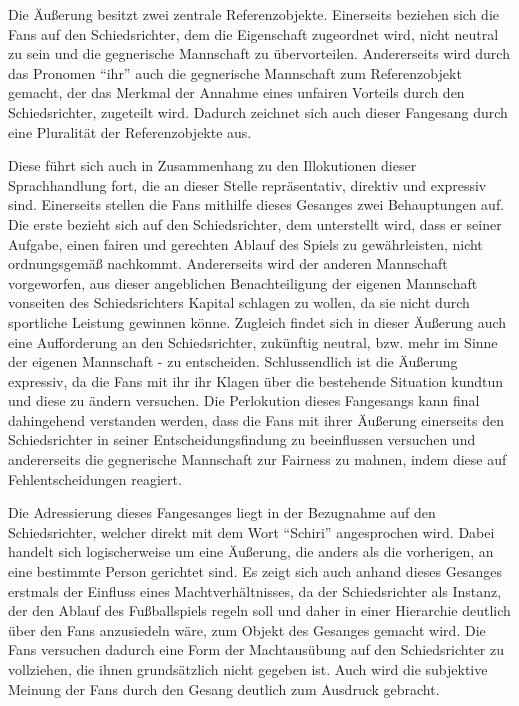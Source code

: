 Die Äußerung besitzt zwei zentrale Referenzobjekte.
Einerseits beziehen sich die Fans auf den Schiedsrichter, dem die Eigenschaft zugeordnet wird, nicht neutral zu sein und die gegnerische Mannschaft zu übervorteilen.
Andererseits wird durch das Pronomen "`ihr"' auch die gegnerische Mannschaft zum Referenzobjekt gemacht, der das Merkmal der Annahme eines unfairen Vorteils durch den Schiedsrichter, zugeteilt wird.
Dadurch zeichnet sich auch dieser Fangesang durch eine Pluralität der Referenzobjekte aus.

Diese führt sich auch in Zusammenhang zu den Illokutionen dieser Sprachhandlung fort, die an dieser Stelle repräsentativ, direktiv und expressiv sind.
Einerseits stellen die Fans mithilfe dieses Gesanges zwei Behauptungen auf.
Die erste bezieht sich auf den Schiedsrichter, dem unterstellt wird, dass er seiner Aufgabe, einen fairen und gerechten Ablauf des Spiels zu gewährleisten, nicht ordnungsgemäß nachkommt.
Andererseits wird der anderen Mannschaft vorgeworfen, aus dieser angeblichen Benachteiligung der eigenen Mannschaft vonseiten des Schiedsrichters Kapital schlagen zu wollen, da sie nicht durch sportliche Leistung gewinnen könne.
Zugleich findet sich in dieser Äußerung auch eine Aufforderung an den Schiedsrichter, zukünftig neutral, bzw. mehr im Sinne der eigenen Mannschaft - zu entscheiden.
Schlussendlich ist die Äußerung expressiv, da die Fans mit ihr ihr Klagen über die bestehende Situation kundtun und diese zu ändern versuchen.
Die Perlokution dieses Fangesangs kann final dahingehend verstanden werden, dass die Fans mit ihrer Äußerung einerseits den Schiedsrichter in seiner Entscheidungsfindung zu beeinflussen versuchen und andererseits die gegnerische Mannschaft zur Fairness zu mahnen, indem diese auf Fehlentscheidungen reagiert.

Die Adressierung dieses Fangesanges liegt in der Bezugnahme auf den Schiedsrichter, welcher direkt mit dem Wort "`Schiri"' angesprochen wird.
Dabei handelt sich logischerweise um eine Äußerung, die anders als die vorherigen, an eine bestimmte Person gerichtet sind.
Es zeigt sich auch anhand dieses Gesanges erstmals der Einfluss eines Machtverhältnisses, da der Schiedsrichter als Instanz, der den Ablauf des Fußballspiels regeln soll und daher in einer Hierarchie deutlich über den Fans anzusiedeln wäre, zum Objekt des Gesanges gemacht wird.
Die Fans versuchen dadurch eine Form der Machtausübung auf den Schiedsrichter zu vollziehen, die ihnen grundsätzlich nicht gegeben ist.
Auch wird die subjektive Meinung der Fans durch den Gesang deutlich zum Ausdruck gebracht.
